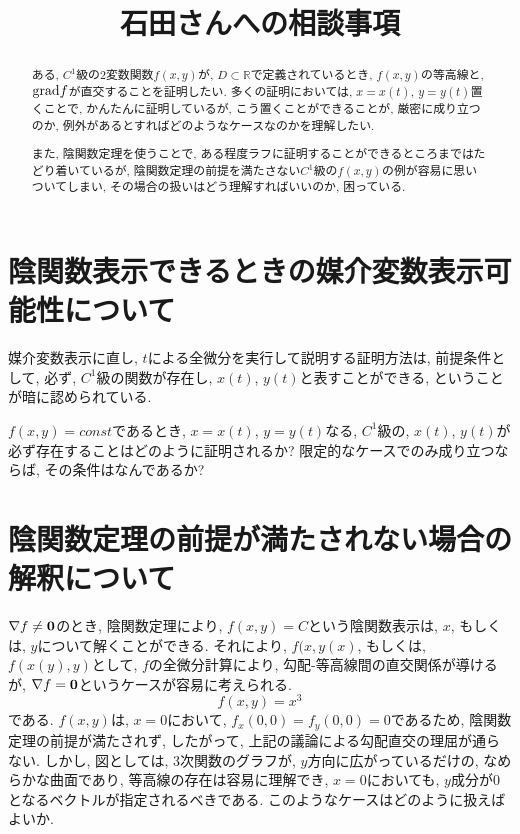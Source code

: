 \documentclass{jsarticle}
\title{石田さんへの相談事項}
\newcommand*{\mbold}[1]{\mbox{\boldmath $#1$}}
\newcommand*{\grad}{{\rm grad}}
\begin{document}
\maketitle
\begin{abstract}
  ある, $C^1$級の$2$変数関数$f(x, y)$が, $D \subset \mathbb{R}$で定義されているとき, 
  $f(x, y)$の等高線と, $\grad{f}$が直交することを証明したい. 
  多くの証明においては, $x = x(t)$, $y = y(t)$置くことで, かんたんに証明しているが, 
  こう置くことができることが, 厳密に成り立つのか, 例外があるとすればどのようなケースなのかを理解したい.

  また, 陰関数定理を使うことで, ある程度ラフに証明することができるところまではたどり着いているが, 陰関数定理の前提を満たさない$C^1$級の$f(x, y)$の例が容易に思いついてしまい, その場合の扱いはどう理解すればいいのか, 困っている. 
\end{abstract}
\section{陰関数表示できるときの媒介変数表示可能性について}
媒介変数表示に直し, $t$による全微分を実行して説明する証明方法は, 前提条件として, 
必ず, $C^1$級の関数が存在し, $x(t)$, $y(t)$と表すことができる, ということが暗に認められている. 

$f(x, y) = const$であるとき, $x = x(t)$, $y = y(t)$なる, $C^1$級の, $x(t)$, $y(t)$が必ず存在することはどのように証明されるか? 限定的なケースでのみ成り立つならば, その条件はなんであるか?

\section{陰関数定理の前提が満たされない場合の解釈について}
$\nabla f \neq \mbold{0}$のとき, 陰関数定理により, $f(x, y) = C$という陰関数表示は, $x$, もしくは, $y$について解くことができる. それにより, $f(x, y(x)$, もしくは, $f(x(y), y)$として, $f$の全微分計算により, 勾配-等高線間の直交関係が導けるが, $\nabla f = \mbold{0}$というケースが容易に考えられる. 
\begin{equation}
  f(x, y) = x^3
\end{equation}
である. $f(x, y)$は, $x = 0$において, $f_x(0, 0) = f_y(0, 0) = 0$であるため, 陰関数定理の前提が満たされず, したがって, 上記の議論による勾配直交の理屈が通らない. 
しかし, 図としては, 3次関数のグラフが, $y$方向に広がっているだけの, なめらかな曲面であり, 等高線の存在は容易に理解でき, $x = 0$においても, $y$成分が$0$となるベクトルが指定されるべきである. 
このようなケースはどのように扱えばよいか. 
\end{document}
